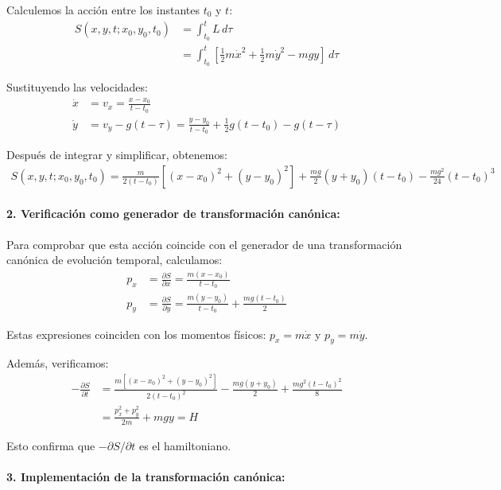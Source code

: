 \documentclass[12pt]{article}
\begin{document}
\begin{enumerate}
  Calculemos la acción entre los instantes $t_0$ y $t$:
  \begin{align}
  S(x,y,t;x_0,y_0,t_0) &= \int_{t_0}^{t} L\,d\tau \\
  &= \int_{t_0}^{t} \left[\frac{1}{2}m\dot{x}^2 + \frac{1}{2}m\dot{y}^2 - mgy\right]\,d\tau
  \end{align}

  Sustituyendo las velocidades:
  \begin{align}
  \dot{x} &= v_x = \frac{x-x_0}{t-t_0} \\
  \dot{y} &= v_y - g(t-\tau) = \frac{y-y_0}{t-t_0} + \frac{1}{2}g(t-t_0) - g(t-\tau)
  \end{align}

  Después de integrar y simplificar, obtenemos:
  \begin{align}
  S(x,y,t;x_0,y_0,t_0) = \frac{m}{2(t-t_0)}[(x-x_0)^2 + (y-y_0)^2] + \frac{mg}{2}(y+y_0)(t-t_0) - \frac{mg^2}{24}(t-t_0)^3
  \end{align}

  \paragraph{2. Verificación como generador de transformación canónica:}

  Para comprobar que esta acción coincide con el generador de una transformación canónica de evolución temporal, calculamos:
  \begin{align}
  p_x &= \frac{\partial S}{\partial x} = \frac{m(x-x_0)}{t-t_0} \\
  p_y &= \frac{\partial S}{\partial y} = \frac{m(y-y_0)}{t-t_0} + \frac{mg(t-t_0)}{2}
  \end{align}

  Estas expresiones coinciden con los momentos físicos: $p_x = m\dot{x}$ y $p_y = m\dot{y}$.

  Además, verificamos:
  \begin{align}
  -\frac{\partial S}{\partial t} &= \frac{m[(x-x_0)^2+(y-y_0)^2]}{2(t-t_0)^2} - \frac{mg(y+y_0)}{2} + \frac{mg^2(t-t_0)^2}{8} \\
  &= \frac{p_x^2+p_y^2}{2m} + mgy = H
  \end{align}

  Esto confirma que $-\partial S/\partial t$ es el hamiltoniano.

  \paragraph{3. Implementación de la transformación canónica:}


\end{enumerate}
\end{document}
